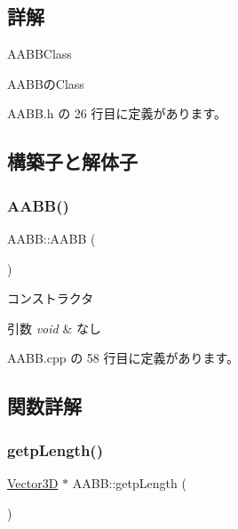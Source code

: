 \subsection{詳解}
A\+A\+B\+B\+Class 

A\+A\+B\+Bの\+Class 

 A\+A\+B\+B.\+h の 26 行目に定義があります。



\subsection{構築子と解体子}
\mbox{\label{class_a_a_b_b_a5f5baf6c533905aa1456b3a3eb57bab2}} 
\subsubsection{\texorpdfstring{A\+A\+B\+B()}{AABB()}}
{\footnotesize\ttfamily A\+A\+B\+B\+::\+A\+A\+BB (\begin{DoxyParamCaption}{ }\end{DoxyParamCaption})}



コンストラクタ 


\begin{DoxyParams}{引数}
{\em void} & なし \\
\hline
\end{DoxyParams}


 A\+A\+B\+B.\+cpp の 58 行目に定義があります。



\subsection{関数詳解}
\mbox{\label{class_a_a_b_b_ad86a852594d4a7833b74588937e0c55c}} 
\subsubsection{\texorpdfstring{getp\+Length()}{getpLength()}}
{\footnotesize\ttfamily \mbox{\hyperlink{class_vector3_d}{Vector3D}} $\ast$ A\+A\+B\+B\+::getp\+Length (\begin{DoxyParamCaption}{ }\end{DoxyParamCaption})}



